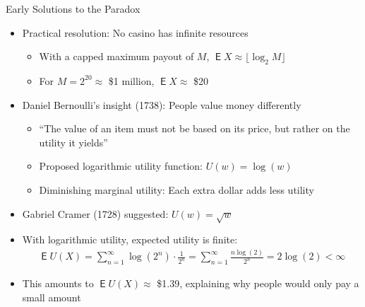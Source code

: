\documentclass[10pt]{beamer}
\DeclareMathOperator\expc{\mathsf{E}}
\begin{document}
\begin{frame}{Early Solutions to the Paradox}
  \begin{itemize}[<+->]
    \item Practical resolution: No casino has infinite resources
      \begin{itemize}
        \item With a capped maximum payout of $M$, $\expc{X} \approx \lfloor \log_2 M \rfloor$
        \item For $M = 2^{20} \approx$ \$1 million, $\expc{X} \approx$ \$20
      \end{itemize}
    \item Daniel Bernoulli's insight (1738): People value money differently
      \begin{itemize}
        \item ``The value of an item must not be based on its price, but rather on the utility it yields''
        \item Proposed logarithmic utility function: $U(w) = \log(w)$
        \item Diminishing marginal utility: Each extra dollar adds less utility
      \end{itemize}
    \item Gabriel Cramer (1728) suggested: $U(w) = \sqrt{w}$ 
    \item With logarithmic utility, expected utility is finite:
      \begin{align*}
        \expc{U(X)} = \sum_{n=1}^{\infty} \log(2^n) \cdot \frac{1}{2^n} = \sum_{n=1}^{\infty} \frac{n \log(2)}{2^n} = 2\log(2) < \infty
      \end{align*}
    \item This amounts to $\expc{U(X)} \approx$ \$1.39, explaining why people would only pay a small amount
  \end{itemize}
\end{frame}
\end{document}

